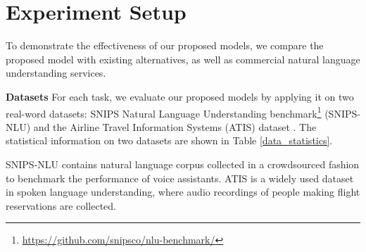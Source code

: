 \section{Experiment Setup}
To demonstrate the effectiveness of our proposed models, we compare the proposed model {\ModelName} with existing alternatives, as well as commercial natural language understanding services.

\noindent\textbf{Datasets}
For each task, we evaluate our proposed models by applying it on two real-word datasets: SNIPS Natural Language Understanding benchmark\footnote{\url{https://github.com/snipsco/nlu-benchmark/}} (SNIPS-NLU) and the Airline Travel Information Systems (ATIS) dataset \cite{tur2010left}. The statistical information on two datasets are shown in Table \ref{data_statistics}.

\begin{table}[h!]
\centering
{}
\vspace{0.05in}
\caption{Dataset statistics.}
\label{data_statistics}
\end{table}

SNIPS-NLU contains natural language corpus collected in a crowdsourced fashion to benchmark the performance of voice assistants.
ATIS is a widely used dataset in spoken language understanding, where audio recordings of people making flight reservations are collected.


